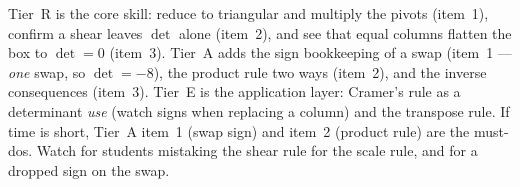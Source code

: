 \documentclass[10pt]{article}
\begin{document}
\begin{teachernote}
Tier~R is the core skill: reduce to triangular and multiply the pivots (item~1), confirm a shear
leaves $\det$ alone (item~2), and see that equal columns flatten the box to $\det=0$ (item~3). Tier~A
adds the sign bookkeeping of a swap (item~1 --- \emph{one} swap, so $\det=-8$), the product rule two
ways (item~2), and the inverse consequences (item~3). Tier~E is the application layer: Cramer's rule as
a determinant \emph{use} (watch signs when replacing a column) and the transpose rule. If time is
short, Tier~A item~1 (swap sign) and item~2 (product rule) are the must-dos. Watch for students
mistaking the shear rule for the scale rule, and for a dropped sign on the swap.
\end{teachernote}
\end{document}
